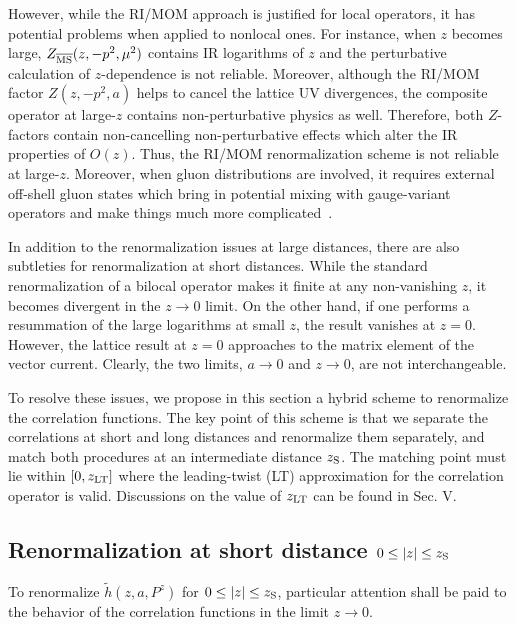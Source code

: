 \documentclass[preprint,12pt]{elsarticle}
\begin{document}
However, while the RI/MOM approach is justified
for local operators, it has potential problems when
applied to nonlocal ones.
For instance, when $z$ becomes large,
$Z_{\overline{\rm MS}}(z,-p^2,\mu^2)$ contains IR
logarithms of $z$ and the perturbative calculation
of $z$-dependence is not reliable. Moreover,
although the RI/MOM factor $Z(z,-p^2,a)$ helps to cancel
the lattice UV divergences, the composite operator
at large-$z$ contains non-perturbative physics as well.
Therefore, both $Z$-factors contain non-cancelling
non-perturbative effects which alter the IR properties
of $O(z)$. Thus, the RI/MOM renormalization scheme is not reliable
at large-$z$. Moreover, when gluon distributions
are involved, it requires external off-shell gluon states which
bring in potential mixing with gauge-variant operators and make things much more complicated~\cite{Wang:2019tgg}.

In addition to the renormalization issues at large distances, there are also 
subtleties for renormalization at short distances. While the standard renormalization
of a bilocal operator makes it finite at any non-vanishing
$z$, it becomes divergent in the $z\to 0$ limit. On the other hand, if one performs a resummation of the large 
logarithms at small $z$, the result vanishes at $z=0$. However, the lattice
result at $z=0$ approaches to the matrix element of the vector current. 
Clearly, the two limits, $a\to 0$ and $z\to 0$,
are not interchangeable.

To resolve these issues, we propose in this section a
hybrid scheme to renormalize the correlation functions. The key point of this scheme is that we separate the correlations
at short and long distances and renormalize them separately, and match both procedures
at an intermediate distance $z_{\rm S}$. The
matching point must lie within $[0,z_{\rm LT}]$ where
the leading-twist (LT) approximation for the correlation
operator is valid. Discussions on the value of
$z_{\rm LT}$ can be found in Sec. V.

\subsection{Renormalization at short distance $0\le |z|\le z_{\rm S}$}
\label{sec:short}

To renormalize $\tilde h(z,a, P^z)$ for $0\le |z|\le z_{\rm S}$, particular attention shall be paid to the behavior of the correlation functions in the limit $z\to 0$.
\end{document}
